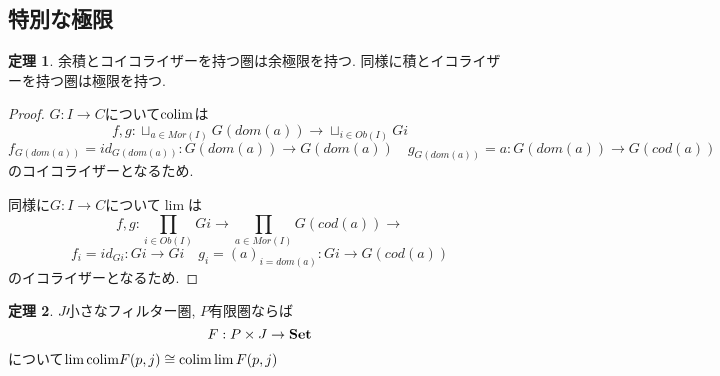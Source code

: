 \documentclass[dvipdfmx,a4paper,11pt]{article}
\newcommand{\colim}{{\rm colim}}
\theoremstyle{definition}
\newtheorem{thm}{定理}
\newcommand{\xr}[1]{\textcolor{red}{#1}}
\begin{document}


\subsection{特別な極限}

 \begin{tcolorbox}
 [colback = white, colframe = green!35!black, fonttitle = \bfseries,breakable = true]
\begin{thm}
\label{thm-eq-pro}
余積とコイコライザーを持つ圏は余極限を持つ. 
同様に積とイコライザーを持つ圏は極限を持つ. 
\end{thm}
\end{tcolorbox}

\begin{proof}
$G : I \to C$について$\colim$は
$$
f,g : \sqcup_{a\in Mor(I)} G(dom(a)) \to \sqcup_{i \in Ob(I)} Gi 
$$
$$
f_{G(dom(a)) }=id_{G(dom(a))} : G(dom(a)) \to G(dom(a))
\quad g_{G(dom(a))}=a : G(dom(a)) \to G(cod(a))
$$
のコイコライザーとなるため. 

同様に$G : I \to C$について$\lim$は
$$
f,g : \prod_{i \in Ob(I)} Gi  \to \prod_{a\in Mor(I)} G(cod(a)) \to 
$$
$$
f_{i}=id_{Gi} : Gi\to Gi
\quad g_{i}=(a)_{i = dom(a)} : Gi\to G(cod(a))
$$
のイコライザーとなるため. 
\end{proof}

 \begin{tcolorbox}
 [colback = white, colframe = green!35!black, fonttitle = \bfseries,breakable = true]
\begin{thm}
\label{thm-filter}
$J$小さなフィルター圏, $P$有限圏ならば
$$
F : P \times J \to \text{{\bf Set}}
$$
について$\lim \colim F(p,j) \cong \colim \lim F(p,j)$
\end{thm}
\end{tcolorbox}
\end{document}
